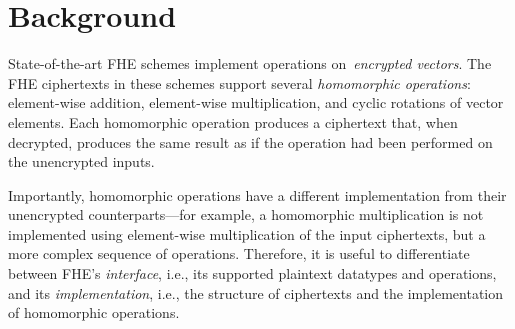 \chapter{Background}\label{sec:background}




State-of-the-art %
FHE schemes implement operations on~\emph{encrypted vectors}.
The FHE ciphertexts in these schemes support several \emph{homomorphic operations}:
element-wise addition, element-wise multiplication, and cyclic rotations of vector elements.
Each homomorphic operation produces a ciphertext that, when decrypted,
produces the same result as if the operation had been performed on the unencrypted inputs.

Importantly, homomorphic operations have a different implementation from their unencrypted counterparts---for example,
a homomorphic multiplication is not implemented using element-wise multiplication
of the input ciphertexts, but a more complex
sequence of operations. Therefore, it is useful to differentiate between FHE's \emph{interface},
i.e., its supported plaintext datatypes and operations,
and its \emph{implementation},
i.e., the structure of ciphertexts and the implementation of homomorphic operations.

